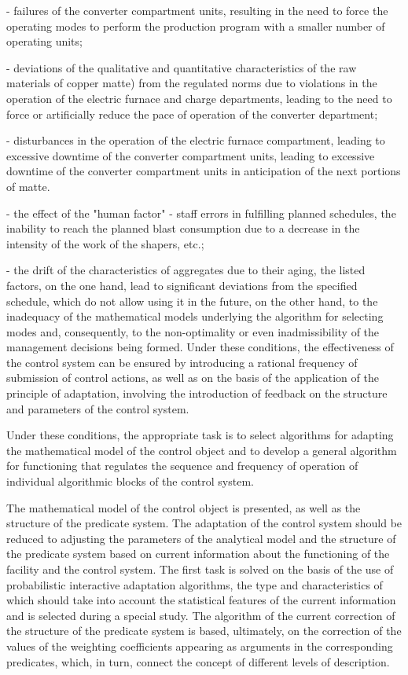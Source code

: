 - failures of the converter compartment units, resulting in the need to
force the operating modes to perform the production program with a
smaller number of operating units;

- deviations of the qualitative and quantitative characteristics of the
raw materials of copper matte) from the regulated norms due to
violations in the operation of the electric furnace and charge
departments, leading to the need to force or artificially reduce the
pace of operation of the converter department;

- disturbances in the operation of the electric furnace compartment,
leading to excessive downtime of the converter compartment units,
leading to excessive downtime of the converter compartment units in
anticipation of the next portions of matte.

- the effect of the "human factor" - staff errors in fulfilling planned
schedules, the inability to reach the planned blast consumption due to a
decrease in the intensity of the work of the shapers, etc.;

- the drift of the characteristics of aggregates due to their aging, the
listed factors, on the one hand, lead to significant deviations from the
specified schedule, which do not allow using it in the future, on the
other hand, to the inadequacy of the mathematical models underlying the
algorithm for selecting modes and, consequently, to the non-optimality
or even inadmissibility of the management decisions being formed. Under
these conditions, the effectiveness of the control system can be ensured
by introducing a rational frequency of submission of control actions, as
well as on the basis of the application of the principle of adaptation,
involving the introduction of feedback on the structure and parameters
of the control system.

Under these conditions, the appropriate task is to select algorithms for
adapting the mathematical model of the control object and to develop a
general algorithm for functioning that regulates the sequence and
frequency of operation of individual algorithmic blocks of the control
system.

The mathematical model of the control object is presented, as well as
the structure of the predicate system. The adaptation of the control
system should be reduced to adjusting the parameters of the analytical
model and the structure of the predicate system based on current
information about the functioning of the facility and the control
system. The first task is solved on the basis of the use of
probabilistic interactive adaptation algorithms, the type and
characteristics of which should take into account the statistical
features of the current information and is selected during a special
study. The algorithm of the current correction of the structure of the
predicate system is based, ultimately, on the correction of the values
of the weighting coefficients appearing as arguments in the
corresponding predicates, which, in turn, connect the concept of
different levels of description.

